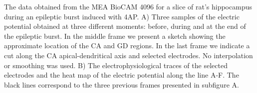 The data obtained from the MEA BioCAM 4096 for a slice of rat's hippocampus during an epileptic burst induced with 4AP. A) Three samples of the electric potential obtained at three different moments: before, during and at the end of the epileptic burst. In the middle frame we present a sketch showing the approximate location of the CA and GD regions. In the last frame we indicate a cut along the CA apical-dendritical axis and selected electrodes. No interpolation or smoothing was used.
B) The electrophysiological traces of the selected electrodes and the heat map of the electric potential along the line A-F. The black lines correspond to the three previous frames presented in subfigure A. 
